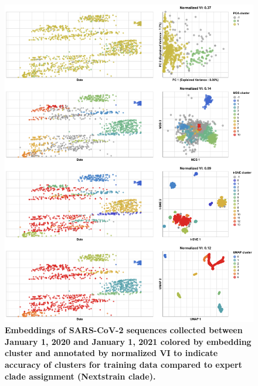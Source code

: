 \documentclass[10pt,letterpaper]{article}
\begin{document}
\begin{figure}[!h]
\includegraphics[width=\columnwidth]{figures/sarscov2-embeddings-by-cluster-vs-Nextstrain_clade.png}
\caption{{\bf Embeddings of SARS-CoV-2 sequences collected between January 1, 2020 and January 1, 2021 colored by embedding cluster and annotated by normalized VI to indicate accuracy of clusters for training data compared to expert clade assignment (Nextstrain clade).}
}
\label{fig:sars-cov-2-2020-2021-clusters-vs-Nextstrain-clade}
\end{figure}
\end{document}

